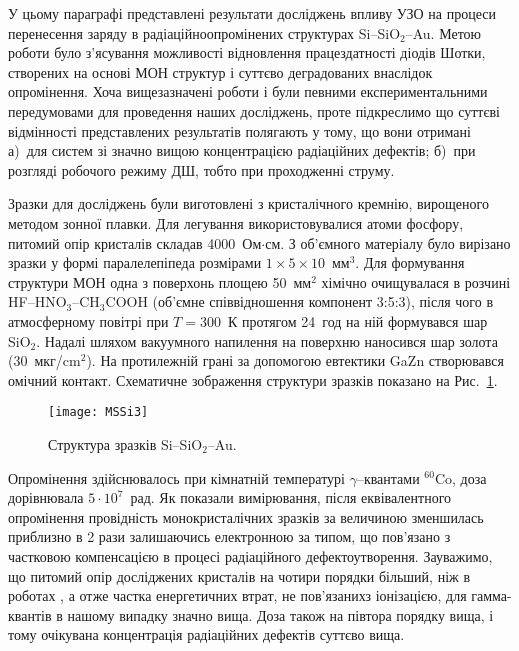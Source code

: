 \documentclass[a4paper,14pt,oneside,openany]{memoir}
\begin{document}
У цьому параграфі представлені результати досліджень впливу УЗО на процеси перенесення заряду в радіаційноопромінених структурах Si--SiO$_2$--Au.
Метою роботи було з'ясування можливості відновлення працездатності діодів Шотки, створених на основі МОН структур і суттєво деградованих внаслідок опромінення.
Хоча вищезазначені роботи \cite{Parchinskii2000r,Parchinskii2006r} і були певними експериментальними передумовами для проведення наших досліджень, проте
підкреслимо що суттєві відмінності представлених результатів полягають у тому, що вони отримані
а)~для систем зі значно вищою концентрацією радіаційних дефектів;
б)~при розгляді робочого режиму ДШ, тобто при проходженні струму.



Зразки для досліджень були виготовлені з кристалічного кремнію, вирощеного методом зонної плавки.
Для легування використовувалися атоми фосфору, питомий опір кристалів складав 4000~Ом$\cdot$см.
З об'ємного матеріалу було вирізано зразки у формі паралелепіпеда розмірами $1\times5\times10$~мм$^3$.
Для формування структури МОН одна з поверхонь площею 50~мм$^2$ хімічно очищувалася в розчині HF--HNO$_3$--CH$_3$COOH (об'ємне співвідношення компонент 3:5:3),
після чого в атмосферному повітрі при $T=300$~К протягом 24~год на ній формувався шар SiO$_2$.
Надалі шляхом вакуумного напилення на поверхню наносився шар золота (30~мкг/cm$^2$).
На протилежній грані за допомогою евтектики GaZn створювався омічний контакт.
Схематичне зображення структури зразків показано на Рис.~\ref{figMSSi3}.

\begin{figure}[b]
\center
\texttt{[image: MSSi3]}%
\caption{\label{figMSSi3}
Структура зразків Si--SiO$_2$--Au.
}
\end{figure}

Опромінення здійснювалось при кімнатній температурі $\gamma$--квантами $^{60}$Co, доза дорівнювала $5\cdot10^7$~рад.
Як показали вимірювання, після еквівалентного опромінення провідність монокристалічних зразків за величиною зменшилась приблизно в 2 рази залишаючись електронною за типом,
що пов'язано з частковою компенсацією в процесі радіаційного дефектоутворення.
Зауважимо, що питомий опір досліджених кристалів на чотири порядки більший, ніж в роботах \cite{Parchinskii2000r,Parchinskii2006r}, а отже частка енергетичних втрат, не пов'язанихз іонізацією, для гамма-квантів в нашому випадку значно вища.
Доза також на півтора порядку вища, і тому очікувана концентрація радіаційних дефектів суттєво вища.
\end{document}
